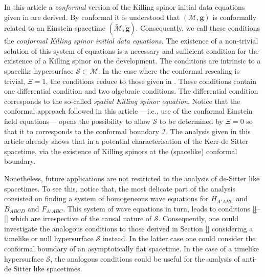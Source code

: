 \documentclass[10pt,a4paper]{article}
\theoremstyle{plain}
\def\bmg{{\bm g}}
\begin{document}
In this article a \emph{conformal} version of the Killing spinor
initial data equations given in \cite{GarVal08c} are derived. By
conformal it is understood that $(\mathcal{M},\bmg)$ is conformally
related to an Einstein spacetime
$(\tilde{\mathcal{M}},\tilde{\bmg})$. Consequently, we call these
conditions the \emph{conformal Killing spinor initial data equations}.
The existence of a non-trivial solution of this system of equations is
a necessary and sufficient condition for the existence of a Killing
spinor on the development. The conditions are intrinsic to a spacelike
hypersurface $\mathcal{S}\subset\mathcal{M}$. In the
case where the conformal rescaling is trivial, $\Xi = 1$, the
conditions reduce to those given in \cite{BaeVal10b}.  These
conditions contain one differential condition and two algebraic
conditions.  The differential condition corresponds to the so-called
\emph{spatial Killing spinor equation}.
Notice that
the conformal approach followed in this article ---i.e., use of the
 conformal Einstein field equations--- opens the
possibility to allow $\mathcal{S}$ to be determined by $\Xi = 0$ so
that it to corresponds to the conformal boundary $\mathscr{I}$. The
analysis given in this article already shows that in a potential
characterisation of the Kerr-de Sitter spacetime, via the existence of
Killing spinors at the (spacelike) conformal boundary.

Nonetheless, future applications are not
restricted to the analysis of de-Sitter like spacetimes. To see this,
notice that, the most delicate part of the analysis consisted on
finding a system of homogeneous wave equations for $H_{A'ABC}$ and
$B_{ABCD}$ and $F_{A'ABC}$. This system of wave equations in turn, leads to
conditions \eqref{}--\eqref{}
which are irrespective of the causal nature of
$\mathcal{S}$. Consequently, one could investigate the analogous
conditions to those derived in Section \ref{}
considering a timelike or null hypersurface $\mathcal{S}$ instead. In
the latter case one could consider the conformal boundary of an
asymptotically flat spacetime. In the case of a timelike hypersurface
$\mathcal{S}$, the analogous conditions could be useful for the
 analysis of anti-de Sitter like spacetimes.
\end{document}
